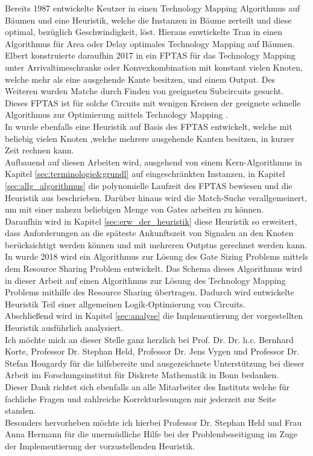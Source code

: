 \documentclass[11pt, a4paper, german]{article}
\newcommand{\TM}{Technology  Mapping }
\begin{document}
Bereits 1987 entwickelte Keutzer in \cite{DAGON} einen \TM Algorithmus auf B\"aumen und eine Heuristik, welche die Instanzen in B\"aume zerteilt und diese optimal, bez\"uglich Geschwindigkeit, l\"ost. Hieraus enwtickelte Tran in \cite{Tran} einen Algorithmus f\"ur Area oder Delay optimales \TM auf B\"aumen.\\
Elbert konstruierte daraufhin 2017 in \cite{Elbert} ein FPTAS f\"ur das \TM unter Arrivaltimeschranke oder Konvexkombination mit konstant vielen Knoten, welche mehr als eine ausgehende Kante besitzen, und einem Output. Des Weiteren wurden Matche durch Finden von geeigneten Subcircuits gesucht.\\
Dieses FPTAS ist f\"ur solche Circuits mit wenigen Kreisen der geeignete schnelle Algorithmus zur Optimierung mittels \TM.\\
In \cite{Elbert} wurde ebenfalls eine Heuristik auf Basis des FPTAS entwickelt, welche mit beliebig vielen Knoten ,welche mehrere ausgehende Kanten besitzen, in kurzer Zeit rechnen kann.\\

Aufbauend auf diesen Arbeiten  wird, ausgehend von einem Kern-Algorith\-mus in Kapitel \ref{sec:terminologie&grundl} auf eingeschränkten Instanzen, in Kapitel \ref{sec:allg_algorithmus} die polynomielle Laufzeit des FPTAS bewiesen und die Heuristik aus \cite{Elbert} beschrieben. 
Darüber hinaus wird die Match-Suche verallgemeinert, um mit einer nahezu beliebigen Menge von Gates arbeiten zu k\"onnen.\\
Daraufhin wird in Kapitel \ref{sec:erw_der_heuristik} diese Heuristik so erweitert, dass Anforderungen an die sp\"ateste Ankunftszeit von Signalen an den Knoten ber\"ucksichtigt werden k\"onnen und mit mehreren Outptus gerechnet werden kann.\\
In \cite{Daboul2018} wurde 2018 wird ein Algorithmus zur L\"osung des Gate Sizing Problems mittels dem Resource Sharing Problem entwickelt. Das Schema dieses Algorithmus wird in dieser Arbeit auf einen Algorithmus zur L\"osung des \TM Problems mithilfe des Resource Sharing \"ubertragen.
Dadurch wird entwickelte Heuristik Teil einer allgemeinen Logik-Optimierung von Circuits. \\
Abschließend wird in Kapitel \ref{sec:analyse} die Implementierung der vorgestellten Heuristik ausführlich analysiert.\\

Ich m\"ochte mich an dieser Stelle ganz herzlich bei Prof. Dr. Dr. h.c. Bernhard Korte, Professor Dr. Stephan Held, Professor Dr. Jens Vygen und Professor Dr. Stefan Hougardy f\"ur die hilfsbereite und ausgezeichnete Unterst\"utzung bei dieser Arbeit im Forschungsinstitut f\"ur Diskrete Mathematik in Bonn bedanken.\\
Dieser Dank richtet sich ebenfalls an alle Mitarbeiter des Instituts welche f\"ur fachliche Fragen und zahlreiche Korrekturlesungen mir jederzeit zur Seite standen.\\
Besonders hervorheben m\"ochte ich hierbei Professor Dr. Stephan Held und Frau Anna Hermann f\"ur die unermüdliche Hilfe bei der Problembeseitigung im Zuge der Implementierung der vorzustellenden Heuristik.
\end{document}
